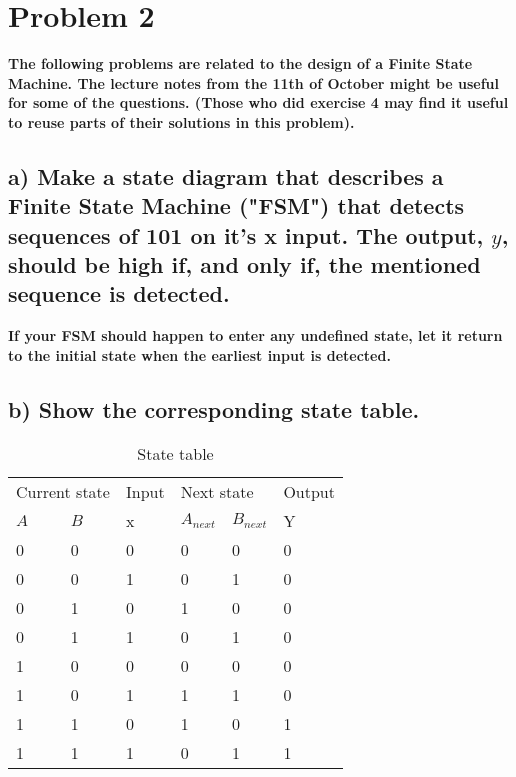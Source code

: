 \section{Problem 2}
\textbf{The following problems are related to the design of a Finite State Machine. The lecture notes from the 11th of October might be useful for some of the questions. (Those who did exercise 4 may find it useful to reuse parts of their solutions in this problem).}
\subsection*{a) Make a state diagram that describes a Finite State Machine ("FSM") that detects sequences of 101 on it's x input. The output, $y$, should be high if, and only if, the mentioned sequence is detected.}
\textbf{If your FSM should happen to enter any undefined state, let it return to the initial state when the earliest input is detected.}


\subsection*{b) Show the corresponding state table.}


\begin{table}[H]
    \centering
    \caption{State table}
    \begin{tabular}{|l|l|l|l|l|l|}
        \hline
    \multicolumn{2}{|l|}{Current state} &  Input& \multicolumn{2}{|l|}{Next state} & Output \\
            $A$  &$B$& x &$A_{next}$&$B_{next}$& Y \\
            \hline
                0& 0 & 0 &     0    &    0     & 0 \\
                0& 0 & 1 &     0    &    1     & 0 \\
                0& 1 & 0 &     1    &    0     & 0 \\
                0& 1 & 1 &     0    &    1     & 0 \\
                1& 0 & 0 &     0    &    0     & 0 \\
                1& 0 & 1 &     1    &    1     & 0 \\
                1& 1 & 0 &     1    &    0     & 1 \\
                1& 1 & 1 &     0    &    1     & 1 \\
                \hline
    \end{tabular}
    \end{table}

